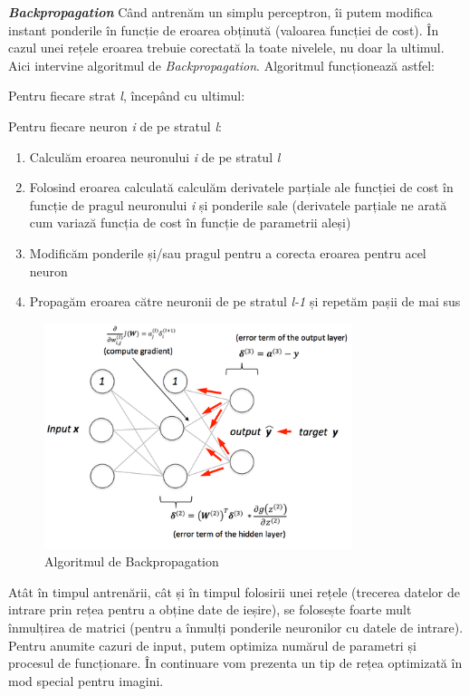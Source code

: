 \textit{\textbf{Backpropagation}}
Când antrenăm un simplu perceptron, îi putem modifica instant ponderile în funcție de eroarea obținută (valoarea funcției de cost). În cazul unei rețele eroarea trebuie corectată la toate nivelele, nu doar la ultimul. Aici intervine algoritmul de \textit{Backpropagation}.
Algoritmul funcționează astfel:\cite{benchea-course}

Pentru fiecare strat \textit{l}, începând cu ultimul:

\quad Pentru fiecare neuron \textit{i} de pe stratul \textit{l}:
\begin{enumerate}
    \item Calculăm eroarea neuronului \textit{i} de pe stratul \textit{l}
    \item Folosind eroarea calculată calculăm derivatele parțiale ale funcției de cost în funcție de pragul neuronului \textit{i} și ponderile sale (derivatele parțiale ne arată cum variază funcția de cost în funcție de parametrii aleși)
    \item Modificăm ponderile și/sau pragul pentru a corecta eroarea pentru acel neuron
    \item Propagăm eroarea către neuronii de pe stratul \textit{l-1} și repetăm pașii de mai sus
\end{enumerate}{}

\begin{figure}[!htbp]
    \begin{center}
        \includegraphics[width=0.8\textwidth]{images/backpropagation.png}
        \caption{Algoritmul de Backpropagation\cite{backpropagation}}
    \end{center}
\end{figure}

Atât în timpul antrenării, cât și în timpul folosirii unei rețele (trecerea datelor de intrare prin rețea pentru a obține date de ieșire), se folosește foarte mult înmulțirea de matrici (pentru a înmulți ponderile neuronilor cu datele de intrare). Pentru anumite cazuri de input, putem optimiza numărul de parametri și procesul de funcționare. În continuare vom prezenta un tip de rețea optimizată în mod special pentru imagini.

